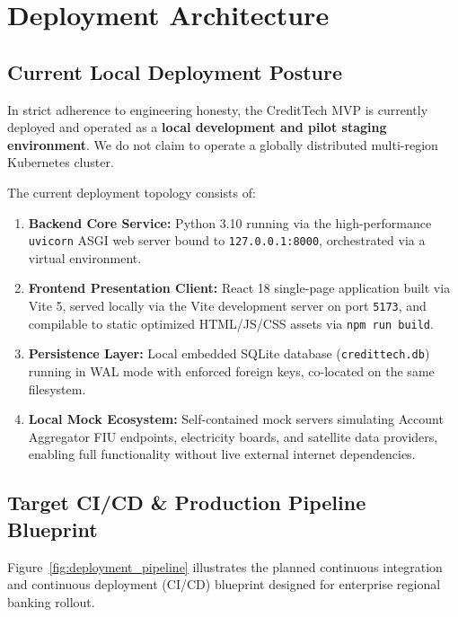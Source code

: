 \documentclass[11pt,a4paper,oneside]{report}
\begin{document}
\chapter{Deployment Architecture}
\label{chap:deployment_architecture}

\section{Current Local Deployment Posture}
In strict adherence to engineering honesty, the CreditTech MVP is currently deployed and operated as a \textbf{local development and pilot staging environment}. We do not claim to operate a globally distributed multi-region Kubernetes cluster. 

The current deployment topology consists of:
\begin{enumerate}
  \item \textbf{Backend Core Service:} Python 3.10 running via the high-performance \texttt{uvicorn} ASGI web server bound to \texttt{127.0.0.1:8000}, orchestrated via a virtual environment.
  \item \textbf{Frontend Presentation Client:} React 18 single-page application built via Vite 5, served locally via the Vite development server on port \texttt{5173}, and compilable to static optimized HTML/JS/CSS assets via \texttt{npm run build}.
  \item \textbf{Persistence Layer:} Local embedded SQLite database (\texttt{credittech.db}) running in WAL mode with enforced foreign keys, co-located on the same filesystem.
  \item \textbf{Local Mock Ecosystem:} Self-contained mock servers simulating Account Aggregator FIU endpoints, electricity boards, and satellite data providers, enabling full functionality without live external internet dependencies.
\end{enumerate}

\section{Target CI/CD \& Production Pipeline Blueprint}
Figure~\ref{fig:deployment_pipeline} illustrates the planned continuous integration and continuous deployment (CI/CD) blueprint designed for enterprise regional banking rollout.
\end{document}
